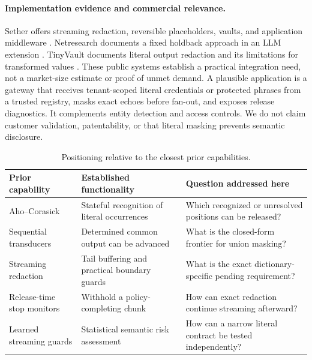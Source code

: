 \documentclass[11pt,a4paper]{article}
\begin{document}
\paragraph{Implementation evidence and commercial relevance.}
Sether offers streaming redaction, reversible placeholders, vaults, and application middleware \cite{sether}. Netresearch documents a fixed holdback approach in an LLM extension \cite{adr}. TinyVault documents literal output redaction and its limitations for transformed values \cite{tinyvault}. These public systems establish a practical integration need, not a market-size estimate or proof of unmet demand. A plausible application is a gateway that receives tenant-scoped literal credentials or protected phrases from a trusted registry, masks exact echoes before fan-out, and exposes release diagnostics. It complements entity detection and access controls. We do not claim customer validation, patentability, or that literal masking prevents semantic disclosure.

\begin{table}[t]
\centering\small
\caption{Positioning relative to the closest prior capabilities.}
\label{tab:related}
\begin{tabular}{>{\raggedright\arraybackslash}p{.23\linewidth}>{\raggedright\arraybackslash}p{.32\linewidth}>{\raggedright\arraybackslash}p{.35\linewidth}}
\toprule
Prior capability & Established functionality & Question addressed here\\\midrule
Aho--Corasick & Stateful recognition of literal occurrences & Which recognized or unresolved positions can be released?\\
Sequential transducers & Determined common output can be advanced & What is the closed-form frontier for union masking?\\
Streaming redaction & Tail buffering and practical boundary guards & What is the exact dictionary-specific pending requirement?\\
Release-time stop monitors & Withhold a policy-completing chunk & How can exact redaction continue streaming afterward?\\
Learned streaming guards & Statistical semantic risk assessment & How can a narrow literal contract be tested independently?\\\bottomrule
\end{tabular}
\end{table}
\end{document}
